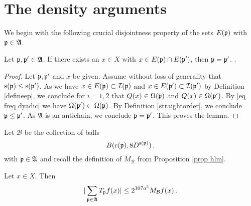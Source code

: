 \section{The density  arguments}\label{sec TT* T*T}

We begin with the following crucial disjointness property of the sets $E(\mathfrak p)$ with $\mathfrak p \in \mathfrak{A}$.
\begin{lemma}
\label{lem antichain -1}
Let $\mathfrak p,\mathfrak p'\in \mathfrak{A}$.
If there exists an $x\in X$ with $x\in  E(\mathfrak p)\cap E(\mathfrak p')$,
then $\mathfrak p= \mathfrak p'$.
.
\end{lemma}
\begin{proof}
Let $\mathfrak p,\mathfrak p'$ and $x$ be given.
Assume without loss of generality that $\mathrm{s}(\mathfrak p)\le \mathrm{s}(\mathfrak p')$.
As we have $x\in E(\mathfrak p)\subset \mathcal{I}(\mathfrak p)$  and $x\in E(\mathfrak p')\subset \mathcal{I}(\mathfrak p')$ by Definition \eqref{defineep}, we conclude
for $i=1,2$ that
${Q}(x)\in\Omega(\mathfrak p)$ and ${Q}(x)\in\Omega(\mathfrak p')$. By \eqref{eq freq dyadic} we have $\Omega(\mathfrak p')\subset \Omega(\mathfrak p)$. By Definition
\eqref{straightorder}, we conclude $\mathfrak p\le \mathfrak p'$. As $\mathfrak{A}$ is an antichain, we conclude $\mathfrak p=\mathfrak p'$.
This proves the lemma.
\end{proof}



Let $\mathcal{B}$ be the collection of balls
\begin{equation}
    B(\mathrm{c}(\mathfrak p), 8D^{\mathrm{s}(\mathfrak p)})\, .
\end{equation}
with $\mathfrak p\in \mathfrak{A}$ and recall the definition of
$M_{\mathcal{B}}$ from Proposition \ref{prop hlm}.
\begin{lemma}\label{lem hlmbound}
Let $x\in X$.
Then
\begin{equation}\label{hlmbound}
    | \sum_{\mathfrak p \in \mathfrak{A}}T_{\mathfrak p} f(x)|\le 2^{107 a^3} M_{\mathcal{B}} f (x) \, .
\end{equation}
\end{lemma}



